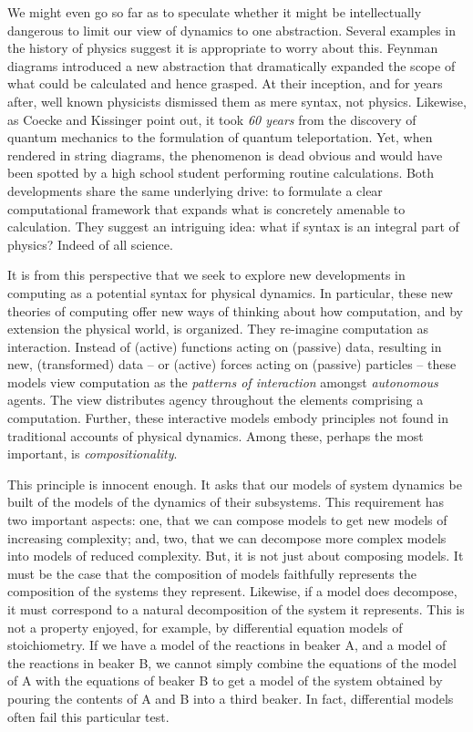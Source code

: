 We might even go so far as to speculate whether it might be
intellectually dangerous to limit our view of dynamics to one
abstraction. Several examples in the history of physics suggest it is
appropriate to worry about this. Feynman diagrams introduced a new
abstraction that dramatically expanded the scope of what could be
calculated and hence grasped. At their inception, and for years after,
well known physicists dismissed them as mere syntax, not
physics. Likewise, as Coecke and Kissinger point out, it took \emph{60
  years} from the discovery of quantum mechanics to the formulation of
quantum teleportation. Yet, when rendered in string diagrams, the
phenomenon is dead obvious and would have been spotted by a high
school student performing routine calculations. Both developments
share the same underlying drive: to formulate a clear computational
framework that expands what is concretely amenable to
calculation. They suggest an intriguing idea: what if syntax is an
integral part of physics? Indeed of all science.

It is from this perspective that we seek to explore new developments
in computing as a potential syntax for physical dynamics. In
particular, these new theories of computing offer new ways of thinking
about how computation, and by extension the physical world, is
organized. They re-imagine computation as interaction. Instead of
(active) functions acting on (passive) data, resulting in new,
(transformed) data -- or (active) forces acting on (passive) particles
-- these models view computation as the \emph{patterns of interaction}
amongst \emph{autonomous} agents. The view distributes agency
throughout the elements comprising a computation. Further, these
interactive models embody principles not found in traditional accounts
of physical dynamics. Among these, perhaps the most important, is
\emph{compositionality}.

This principle is innocent enough. It asks that our models of system
dynamics be built of the models of the dynamics of their
subsystems. This requirement has two important aspects: one, that we
can compose models to get new models of increasing complexity; and,
two, that we can decompose more complex models into models of reduced
complexity. But, it is not just about composing models. It must be the
case that the composition of models faithfully represents the
composition of the systems they represent. Likewise, if a model does
decompose, it must correspond to a natural decomposition of the system
it represents. This is not a property enjoyed, for example, by
differential equation models of stoichiometry. If we have a model of
the reactions in beaker A, and a model of the reactions in beaker B,
we cannot simply combine the equations of the model of A with the
equations of beaker B to get a model of the system obtained by pouring
the contents of A and B into a third beaker. In fact, differential
models often fail this particular test.



